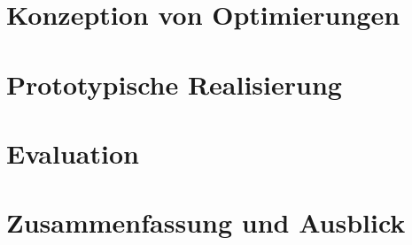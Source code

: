 \vfill\documentclass[12pt]{extarticle}
\begin{document}
\newpage
\section{Konzeption von Optimierungen}



\newpage
\section{Prototypische Realisierung}
\label{sec:realisierung}




\newpage
\section{Evaluation}
\label{sec:evaluation}


\newpage
\section{Zusammenfassung und Ausblick}



\newpage
\sloppy %
\printbibliography[heading=bibintoc, title={Literatur}]
\fussy %


\newpage
{}
\listoffigures

{}
\listoftables

\newpage
\appendix

\end{document}
